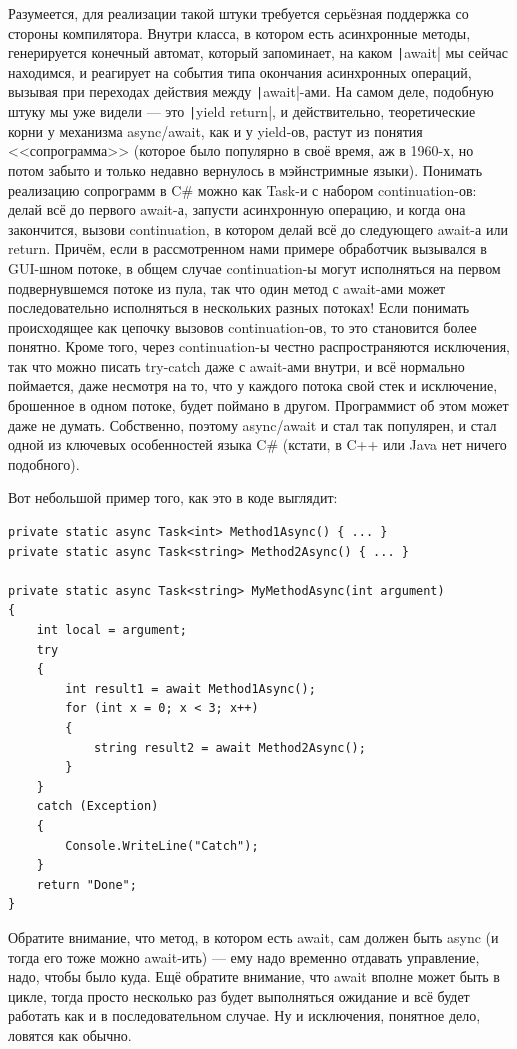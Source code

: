 \documentclass[a5paper]{article}
\begin{document}
Разумеется, для реализации такой штуки требуется серьёзная поддержка со стороны компилятора. Внутри класса, в котором есть асинхронные методы, генерируется конечный автомат, который запоминает, на каком \texttt|await| мы сейчас находимся, и реагирует на события типа окончания асинхронных операций, вызывая при переходах действия между \texttt|await|-ами. На самом деле, подобную штуку мы уже видели --- это \texttt|yield return|, и действительно, теоретические корни у механизма async/await, как и у yield-ов, растут из понятия <<сопрограмма>> (которое было популярно в своё время, аж в 1960-х, но потом забыто и только недавно вернулось в мэйнстримные языки). Понимать реализацию сопрограмм в C\# можно как Task-и с набором continuation-ов: делай всё до первого await-а, запусти асинхронную операцию, и когда она закончится, вызови continuation, в котором делай всё до следующего await-а или return. Причём, если в рассмотренном нами примере обработчик вызывался в GUI-шном потоке, в общем случае continuation-ы могут исполняться на первом подвернувшемся потоке из пула, так что один метод с await-ами может последовательно исполняться в нескольких разных потоках! Если понимать происходящее как цепочку вызовов continuation-ов, то это становится более понятно. Кроме того, через continuation-ы честно распространяются исключения, так что можно писать try-catch даже с await-ами внутри, и всё нормально поймается, даже несмотря на то, что у каждого потока свой стек и исключение, брошенное в одном потоке, будет поймано в другом. Программист об этом может даже не думать. Собственно, поэтому async/await и стал так популярен, и стал одной из ключевых особенностей языка C\# (кстати, в C++ или Java нет ничего подобного).

Вот небольшой пример того, как это в коде выглядит:

\begin{verbatim}
private static async Task<int> Method1Async() { ... }
private static async Task<string> Method2Async() { ... }

private static async Task<string> MyMethodAsync(int argument) 
{
    int local = argument;
    try 
    {
        int result1 = await Method1Async();
        for (int x = 0; x < 3; x++) 
        {
            string result2 = await Method2Async();
        }
    }
    catch (Exception) 
    { 
        Console.WriteLine("Catch"); 
    }
    return "Done";
}
\end{verbatim}

Обратите внимание, что метод, в котором есть await, сам должен быть async (и тогда его тоже можно await-ить) --- ему надо временно отдавать управление, надо, чтобы было куда. Ещё обратите внимание, что await вполне может быть в цикле, тогда просто несколько раз будет выполняться ожидание и всё будет работать как и в последовательном случае. Ну и исключения, понятное дело, ловятся как обычно.
\end{document}
